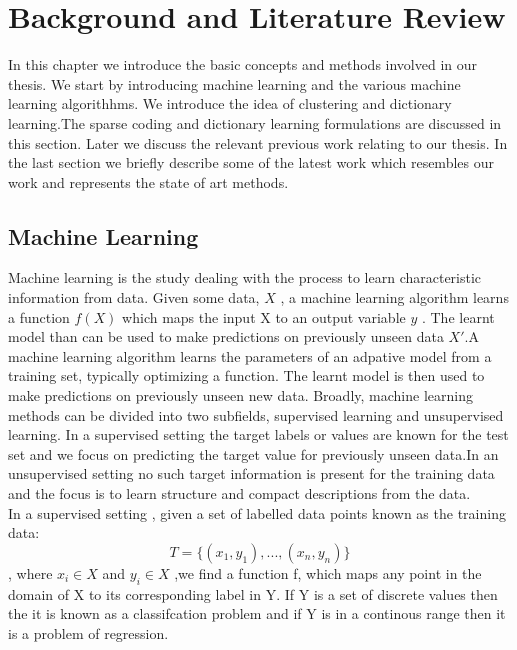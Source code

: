 
\chapter{Background and Literature Review}

\ifpdf
    \graphicspath{{Chapter2/Figs/Raster/}{Chapter2/Figs/PDF/}{Chapter2/Figs/}}
\else
    \graphicspath{{Chapter2/Figs/Vector/}{Chapter2/Figs/}}
\fi

In this chapter we introduce the basic concepts and methods involved in our thesis. We start by introducing machine learning and the various machine learning algorithhms. We introduce the idea of clustering and dictionary learning.The sparse coding and dictionary learning formulations are discussed in this section. Later we discuss the relevant previous work relating to our thesis. In the last section we briefly describe some of the latest work which resembles our work and represents the state of art methods.
\section[Machine Learning]{Machine Learning}

Machine learning is the study dealing with the process to learn characteristic information from data. Given some data, $ X $ , a machine learning algorithm learns a function $ f(X) $ which maps the input X to an output variable $y$ . The learnt model than can be used to make predictions on previously unseen data $X'$.A machine learning algorithm learns the parameters of an adpative model from a training set, typically optimizing a function. The learnt model is then used to make predictions on previously unseen new data. Broadly, machine learning methods can be divided into two subfields, supervised learning and unsupervised learning. In a supervised setting the target labels or values are known for the test set and we focus on predicting the target value for previously unseen data.In an unsupervised setting no such target information is present for the training data and the focus is to learn structure and compact descriptions from the data.\\

In a supervised setting , given a set of labelled  data points known as the training data: $$ T = \{(x_1,y_1),...,(x_n,y_n)\} $$, where $x_i \in X$ and $y_i \in X$ ,we find a function f, which maps any point in the domain of X to its corresponding label in Y.
If Y is a set of discrete values then the it is known as a classifcation problem and if Y is in a continous range then it is a problem of regression.\\


